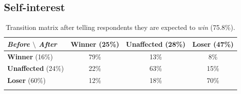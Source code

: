 \documentclass[11pt]{article}
\begin{document}
\begin{appendices}
\begin{table}[H] \centering 
  \caption{Effect of subjective elasticities on perceived environmental effectiveness.} 
  \label{table:elasticities_effectiveness} 
 \end{table} 


    \subsection{Self-interest \label{subsec:app_perception_si}}

\medskip

\begin{table}[H]
\caption[table]{Transition matrix after telling respondents they are expected to \textit{win} (75.8\%).}
{\label{table:transition_matrix_positive_feedback}}
\centering
\begin{tabular}{lccc}
\textit{Before $\setminus$ After} & \textbf{Winner} (25\%) & \textbf{Unaffected} (28\%) & \textbf{Loser} (47\%) \\
\hline
\textbf{Winner} (16\%) & 79\% & 13\% & 8\%\\
\textbf{Unaffected} (24\%) & 22\% & 63\% & 15\% \\
\textbf{Loser} (60\%) & 12\% & 18\% & 70\% \\ \\
\end{tabular}
\end{table}


\end{appendices}
\end{document}
